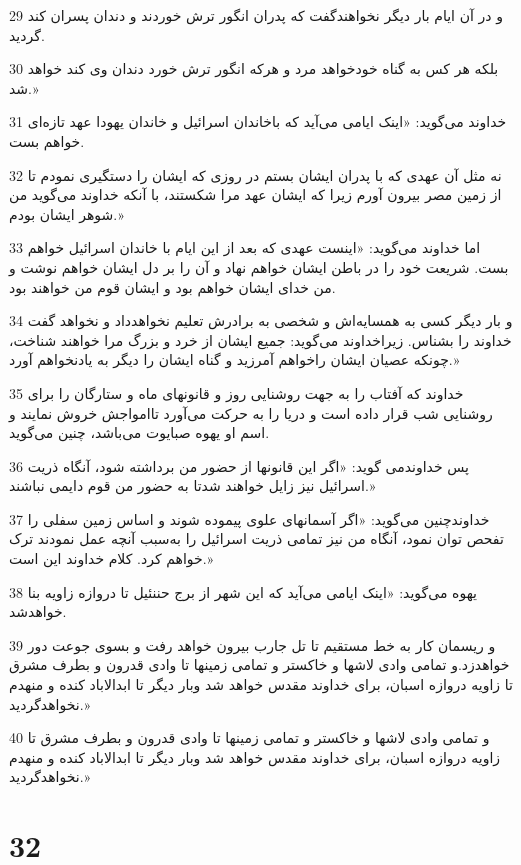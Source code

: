 \par 29 و در آن ایام بار دیگر نخواهندگفت که پدران انگور ترش خوردند و دندان پسران کند گردید.
\par 30 بلکه هر کس به گناه خودخواهد مرد و هر‌که انگور ترش خورد دندان وی کند خواهد شد.»
\par 31 خداوند می‌گوید: «اینک ایامی می‌آید که باخاندان اسرائیل و خاندان یهودا عهد تازه‌ای خواهم بست.
\par 32 نه مثل آن عهدی که با پدران ایشان بستم در روزی که ایشان را دستگیری نمودم تا از زمین مصر بیرون آورم زیرا که ایشان عهد مرا شکستند، با آنکه خداوند می‌گوید من شوهر ایشان بودم.»
\par 33 اما خداوند می‌گوید: «اینست عهدی که بعد از این ایام با خاندان اسرائیل خواهم بست. شریعت خود را در باطن ایشان خواهم نهاد و آن را بر دل ایشان خواهم نوشت و من خدای ایشان خواهم بود و ایشان قوم من خواهند بود.
\par 34 و بار دیگر کسی به همسایه‌اش و شخصی به برادرش تعلیم نخواهدداد و نخواهد گفت خداوند را بشناس. زیراخداوند می‌گوید: جمیع ایشان از خرد و بزرگ مرا خواهند شناخت، چونکه عصیان ایشان راخواهم آمرزید و گناه ایشان را دیگر به یادنخواهم آورد.» 
\par 35 خداوند که آفتاب را به جهت روشنایی روز و قانونهای ماه و ستارگان را برای روشنایی شب قرار داده است و دریا را به حرکت می‌آورد تاامواجش خروش نمایند و اسم او یهوه صبایوت می‌باشد، چنین می‌گوید.
\par 36 پس خداوندمی گوید: «اگر این قانونها از حضور من برداشته شود، آنگاه ذریت اسرائیل نیز زایل خواهند شدتا به حضور من قوم دایمی نباشند.»
\par 37 خداوندچنین می‌گوید: «اگر آسمانهای علوی پیموده شوند و اساس زمین سفلی را تفحص توان نمود، آنگاه من نیز تمامی ذریت اسرائیل را به‌سبب آنچه عمل نمودند ترک خواهم کرد. کلام خداوند این است.»
\par 38 یهوه می‌گوید: «اینک ایامی می‌آید که این شهر از برج حننئیل تا دروازه زاویه بنا خواهدشد.
\par 39 و ریسمان کار به خط مستقیم تا تل جارب بیرون خواهد رفت و بسوی جوعت دور خواهدزد.و تمامی وادی لاشها و خاکستر و تمامی زمینها تا وادی قدرون و بطرف مشرق تا زاویه دروازه اسبان، برای خداوند مقدس خواهد شد وبار دیگر تا ابدالاباد کنده و منهدم نخواهدگردید.»
\par 40 و تمامی وادی لاشها و خاکستر و تمامی زمینها تا وادی قدرون و بطرف مشرق تا زاویه دروازه اسبان، برای خداوند مقدس خواهد شد وبار دیگر تا ابدالاباد کنده و منهدم نخواهدگردید.»
 
\chapter{32}

